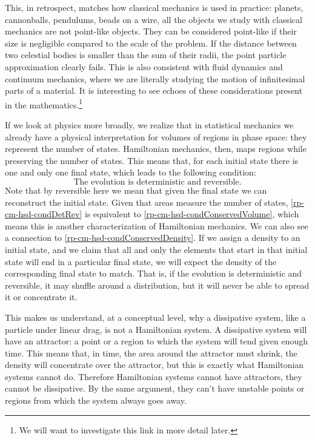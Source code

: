 This, in retrospect, matches how classical mechanics is used in practice: planets, cannonballs, pendulums, beads on a wire, all the objects we study with classical mechanics are not point-like objects. They can be considered point-like if their size is negligible compared to the scale of the problem. If the distance between two celestial bodies is smaller than the sum of their radii, the point particle approximation clearly fails. This is also consistent with fluid dynamics and continuum mechanics, where we are literally studying the motion of infinitesimal parts of a material. It is interesting to see echoes of these considerations present in the mathematics.\footnote{We will want to investigate this link in more detail later.}

If we look at physics more broadly, we realize that in statistical mechanics we already have a physical interpretation for volumes of regions in phase space: they represent the number of states. Hamiltonian mechanics, then, maps regions while preserving the number of states. This means that, for each initial state there is one and only one final state, which leads to the following condition:
\begin{equation}\label{rp-cm-hsd-condDetRev}
	\tag{HM-9}
	\text{The evolution is deterministic and reversible.}	
\end{equation}
Note that by reversible here we mean that given the final state we can reconstruct the initial state. Given that areas measure the number of states, \ref{rp-cm-hsd-condDetRev} is equivalent to \ref{rp-cm-hsd-condConservedVolume}, which means this is another characterization of Hamiltonian mechanics. We can also see a connection to \ref{rp-cm-hsd-condConservedDensity}. If we assign a density to an initial state, and we claim that all and only the elements that start in that initial state will end in a particular final state, we will expect the density of the corresponding final state to match. That is, if the evolution is deterministic and reversible, it may shuffle around a distribution, but it will never be able to spread it or concentrate it.

This makes us understand, at a conceptual level, why a dissipative system, like a particle under linear drag, is not a Hamiltonian system. A dissipative system will have an attractor: a point or a region to which the system will tend given enough time. This means that, in time, the area around the attractor must shrink, the density will concentrate over the attractor, but this is exactly what Hamiltonian systems cannot do. Therefore Hamiltonian systems cannot have attractors, they cannot be dissipative. By the same argument, they can't have unstable points or regions from which the system always goes away.

